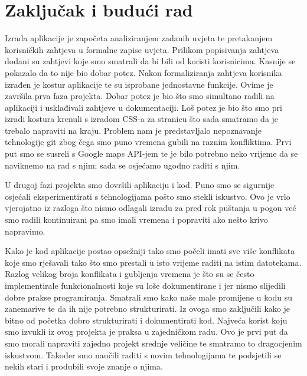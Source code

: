 \chapter{Zaključak i budući rad}
			
		Izrada aplikacije je započeta analiziranjem zadanih uvjeta te pretakanjem korisničkih zahtjeva u formalne zapise uvjeta. Prilikom popisivanja zahtjeva dodani su zahtjevi koje smo smatrali da bi bili od koristi korisnicima. Kasnije se pokazalo da to nije bio dobar potez. \newline
		Nakon formaliziranja zahtjeva korisnika izrađen je kostur aplikacije te su isprobane jednostavne funkcije.\newline
		Ovime je završila prva faza projekta. Dobar potez je bio što smo simultano radili na aplikaciji i usklađivali zahtjeve u dokumentaciji. Loš potez je bio što smo pri izradi kostura krenuli s izradom CSS-a za stranicu što sada smatramo da je trebalo napraviti na kraju. Problem nam je predstavljalo nepoznavanje tehnologije git zbog čega smo puno vremena gubili na raznim konfliktima. Prvi put smo se susreli s Google maps API-jem te je bilo potrebno neko vrijeme da se naviknemo na rad s njim; sada se osjećamo ugodno raditi s njim.
		
		U drugoj fazi projekta smo dovršili aplikaciju i kod. Puno smo se sigurnije osjećali eksperimentirati s tehnologijama pošto smo stekli iskustvo. Ovo je vrlo vjerojatno iz razloga što nismo odlagali izradu za pred rok puštanja u pogon već smo radili kontinuirani pa smo imali vremena i popraviti ako nešto krivo napravimo.\newline
		
		Kako je kod aplikacije postao opsežniji tako smo počeli imati sve više konflikata koje smo rješavali tako što smo prestali u isto vrijeme raditi na istim datotekama. Razlog velikog broja konflikata i gubljenja vremena je što su se često implementirale funkcionalnosti koje su loše dokumentirane i jer nismo slijedili dobre prakse programiranja. Smatrali smo kako naše male promijene u kodu su zanemarive te da ih nije potrebno strukturirati. Iz ovoga smo zaključili kako je bitno od početka dobro strukturirati i dokumentirati kod. Najveća korist koju smo izvukli iz ovog projekta je praksa u zajedničkom radu. Ovo je prvi put da smo morali napraviti zajedno projekt srednje veličine te smatramo to dragocjenim iskustvom. Također smo naučili raditi s novim tehnologijama te podsjetili se nekih stari i produbili svoje znanje o njima.\newline
		
